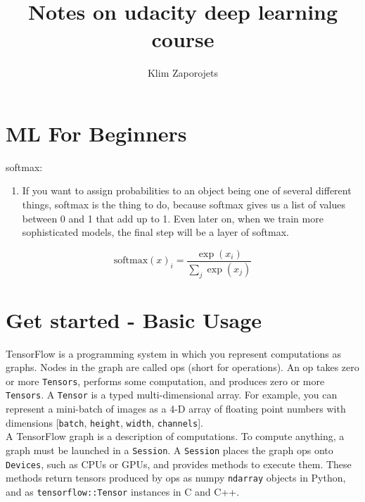 \documentclass[11pt,a4paper]{article}
\author{Klim Zaporojets}
\title{Notes on udacity deep learning course}
\begin{document}
\section{ML For Beginners}
softmax:
\begin{enumerate}
	\item If you want to assign probabilities to an object being one of several different things, softmax is the thing to do, because softmax gives us a list of values between 0 and 1 that add up to 1. Even later on, when we train more sophisticated models, the final step will be a layer of softmax.
\end{enumerate}

$$\text{softmax}(x)_i = \dfrac{\exp(x_i)}{\sum_j{\exp(x_j)}}$$

\section{Get started - Basic Usage}
TensorFlow is a programming system in which you represent computations as graphs. Nodes in the graph are called ops (short for operations). An op takes zero or more \texttt{Tensors}, performs some computation, and produces zero or more \texttt{Tensors}. A \texttt{Tensor} is a typed multi-dimensional array. For example, you can represent a mini-batch of images as a 4-D array of floating point numbers with dimensions [\texttt{batch}, \texttt{height}, \texttt{width}, \texttt{channels}].\\

A TensorFlow graph is a description of computations. To compute anything, a graph must be launched in a \texttt{Session}. A \texttt{Session} places the graph ops onto \texttt{Devices}, such as CPUs or GPUs, and provides methods to execute them. These methods return tensors produced by ops as numpy \texttt{ndarray} objects in Python, and as \texttt{tensorflow::Tensor} instances in C and C++. \\
\end{document}

